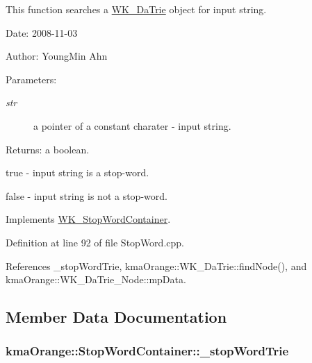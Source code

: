 This function searches a \hyperlink{classkmaOrange_1_1WK__DaTrie}{WK\_\-DaTrie} object for input string. 

\begin{Desc}
\item[Date:]2008-11-03 \end{Desc}
\begin{Desc}
\item[Author:]YoungMin Ahn \end{Desc}
\begin{Desc}
\item[Parameters:]
\begin{description}
\item[{\em str}]a pointer of a constant charater - input string. \end{description}
\end{Desc}
\begin{Desc}
\item[Returns:]a boolean.\par
 true - input string is a stop-word.\par
 false - input string is not a stop-word. \end{Desc}


Implements \hyperlink{classWK__StopWordContainer_03819e17b2d47d76452505b9cf03c685}{WK\_\-StopWordContainer}.

Definition at line 92 of file StopWord.cpp.

References \_\-stopWordTrie, kmaOrange::WK\_\-DaTrie::findNode(), and kmaOrange::WK\_\-DaTrie\_\-Node::mpData.

\subsection{Member Data Documentation}
\hypertarget{classkmaOrange_1_1StopWordContainer_dcc2e81494476e1718dacb36fbe075dc}{
\subsubsection[{\_\-stopWordTrie}]{ {\bf kmaOrange::StopWordContainer::\_\-stopWordTrie}}}
\label{classkmaOrange_1_1StopWordContainer_dcc2e81494476e1718dacb36fbe075dc}


